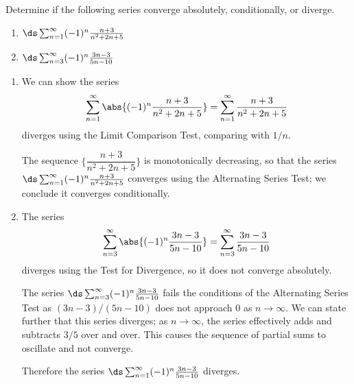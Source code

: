 \begin{example}\label{ex_alt_series2}%
Determine if the following series converge absolutely, conditionally, or diverge.\\
\begin{minipage}{.5\textwidth}
 \begin{enumerate}
  \item $\ds\sum_{n=1}^\infty (-1)^n\frac{n+3}{n^2+2n+5}$
 \end{enumerate}
\end{minipage}%
\begin{minipage}{.5\textwidth}
 \begin{enumerate}\setcounter{enumi}{1}
  \item $\ds\sum_{n=3}^\infty (-1)^n\frac{3n-3}{5n-10}$
 \end{enumerate}
\end{minipage}
\solution
\begin{enumerate}
	\item We can show the series
	\[\sum_{n=1}^\infty \abs{(-1)^n\frac{n+3}{n^2+2n+5}}= \sum_{n=1}^\infty \frac{n+3}{n^2+2n+5}\]
	diverges using the Limit Comparison Test, comparing with $1/n$. 
	
	The sequence $\{\dfrac{n+3}{n^2+2n+5}\}$ is monotonically decreasing, so that the series $\ds \sum_{n=1}^\infty (-1)^n\frac{n+3}{n^2+2n+5}$ converges using the Alternating Series Test; we conclude it converges conditionally.
	
%	
	
	\item	The series
	\[\sum_{n=3}^\infty \abs{(-1)^n\frac{3n-3}{5n-10}} = \sum_{n=3}^\infty \frac{3n-3}{5n-10}\]
	diverges using the Test for Divergence, so it does not converge absolutely. 
	
	The series $\ds \sum_{n=3}^\infty (-1)^n\frac{3n-3}{5n-10}$ fails the conditions of the Alternating Series Test as $(3n-3)/(5n-10)$ does not approach $0$ as $n\to\infty$. We can state further that this series diverges; as $n\to\infty$, the series effectively adds and subtracts $3/5$ over and over. This causes the sequence of partial sums to oscillate and not converge.
	
	Therefore the series $\ds \sum_{n=1}^\infty (-1)^n\frac{3n-3}{5n-10}$ diverges.
\end{enumerate}
\end{example}

